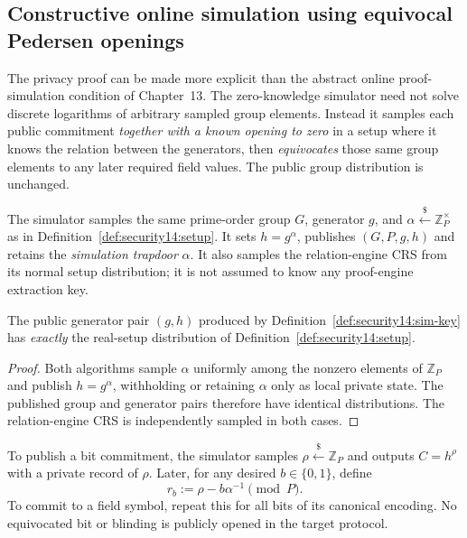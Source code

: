 \subsection{Constructive online simulation using equivocal Pedersen openings}\label{sec:security14:zk}
The privacy proof can be made more explicit than the
abstract online proof-simulation condition of
Chapter~13. The zero-knowledge simulator need not
solve discrete logarithms of arbitrary sampled group
elements. Instead it samples each public commitment
\emph{together with a known opening to zero} in
a setup where it knows the relation between the
generators, then \emph{equivocates} those same
group elements to any later required field values.
The public group distribution is unchanged.

\begin{definition}\label{def:security14:sim-key}
The simulator samples the same prime-order
group $G$, generator $g$, and
$\alpha\overset{\$}{\leftarrow}
\mathbb Z_P^\times$ as in
Definition~\ref{def:security14:setup}.
It sets $h=g^\alpha$,
publishes $(G,P,g,h)$ and
retains the \emph{simulation
trapdoor} $\alpha$.
It also samples the relation-engine
CRS from its normal setup
distribution; it is not assumed
to know any proof-engine
extraction key.
\end{definition}

\begin{lemma}\label{lem:security14:sim-key-law}
The public generator pair
$(g,h)$ produced by
Definition~\ref{def:security14:sim-key}
has \emph{exactly} the
real-setup distribution of
Definition~\ref{def:security14:setup}.
\end{lemma}
\begin{proof}
Both algorithms sample
$\alpha$ uniformly among
the nonzero elements of
$\mathbb Z_P$ and publish
$h=g^\alpha$, withholding
or retaining $\alpha$
only as local private state.
The published group and
generator pairs therefore
have identical distributions.
The relation-engine CRS
is independently sampled
in both cases.
\end{proof}

\begin{definition}\label{def:security14:equiv}
To publish a bit commitment,
the simulator samples
$\rho\overset{\$}{\leftarrow}
\mathbb Z_P$ and outputs
$C=h^\rho$ with a private
record of $\rho$.
Later, for any desired
$b\in\{0,1\}$, define
\[
 \boxed{r_b:=\rho-b\alpha^{-1}
        \pmod P.}
\]
To commit to a field symbol,
repeat this for all bits of
its canonical encoding.
No equivocated bit or
blinding is publicly opened
in the target protocol.
\end{definition}

